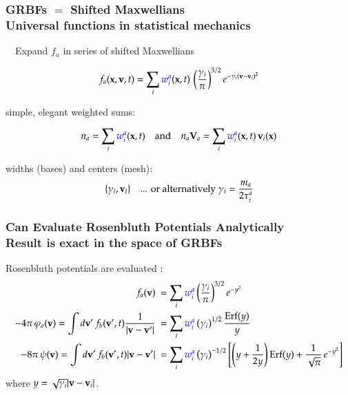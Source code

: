 \begin{frame}
\frametitle{GRBFs $=$ Shifted Maxwellians\\
\textcolor{egg}{\large Universal functions in statistical mechanics}}

~~Expand $f_a$ in series of shifted Maxwellians

\begin{equation*}
f_a(\mathbf{x},\mathbf{v},t) = \sum_i \textcolor{blue}{w_i^a}(\mathbf{x},t) \,
\left(\frac{\gamma_i}{\pi}\right)^{3/2}
e^{-\gamma_i(\mathbf{v}-\mathbf{v}_i)^2}
\end{equation*}

 simple, elegant weighted sums:

\begin{equation*}
n_a = \sum_i \textcolor{blue}{w_i^a} (\mathbf{x},t)
\quad\mbox{and}\quad
n_a \mathbf{V}_a = \sum_i \textcolor{blue}{w_i^a} (\mathbf{x},t) \, \mathbf{v}_i(\mathbf{x})
\end{equation*}

 widths (bases) and centers (mesh):
\begin{equation*}
  \{ \gamma_i, \mathbf{v}_i \} \quad\mbox{... or alternatively} \; \gamma_i = \frac{m_a}{2{\tau}_i^a}
\end{equation*}

\end{frame}

\begin{frame}
\frametitle{Can Evaluate Rosenbluth Potentials Analytically\\
\textcolor{egg}{\large Result is exact in the space of GRBFs}}

Rosenbluth potentials are evaluated :
%
\begin{align*}
f_a(\mathbf{v}) &~=
\sum_i \textcolor{blue}{w_i^a} \left(\frac{\gamma_i}{\pi}\right)^{3/2} e^{-y^2} \\
-4 \pi \, \varphi_a(\mathbf{v}) = \int d\mathbf{v}^\prime \, f_b(\mathbf{v}^\prime,t)\frac{1}{|\mathbf{v}-\mathbf{v}^\prime|} &~=
\sum_i \textcolor{blue}{w_i^a} \left(\gamma_i\right)^{1/2} \frac{\mathrm{Erf}(y)}{y}
\\
-8 \pi \, \psi(\mathbf{v}) = \int d\mathbf{v}^\prime \, f_b(\mathbf{v}^\prime,t){|\mathbf{v}-\mathbf{v}^\prime|} &~=
\sum_i \textcolor{blue}{w_i^a} \left( \gamma_i \right)^{-1/2}
\left[ \left(y+\frac{1}{2y}\right) \mathrm{Erf}(y)
+ \frac{1}{\sqrt{\pi}} \, e^{-y^2} \right]
\\
\end{align*}
%
where $y = \sqrt{\gamma_i} | \mathbf{v} - \mathbf{v}_i|$.
\end{frame}

